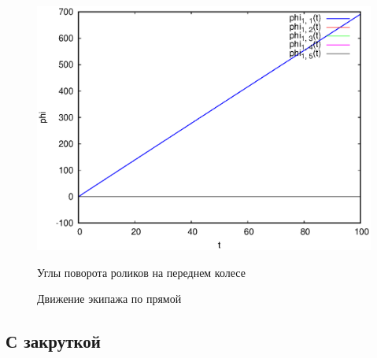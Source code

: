 \begin{figure}[h]
{        \includegraphics[scale=0.33]{pic/straight_100/phi1.eps}
        \caption{Углы поворота роликов на переднем колесе}
        \label{fig:straight_100_phi1}
    }
    \hspace{10pt}
    \caption{Движение экипажа по прямой}
\end{figure}

\newpage

\subsection{С закруткой}

